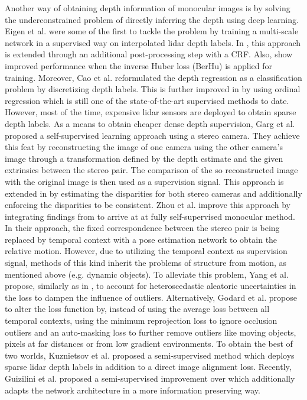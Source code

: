 Another way of obtaining depth information of monocular images is by solving the underconstrained problem of directly inferring the depth using deep learning. Eigen et al. \cite{eigen2014depth} were some of the first to tackle the problem by training a multi-scale network in a supervised way on interpolated lidar depth labels. In \cite{liu2015deep,li2015depth}, this approach is extended through an additional post-processing step with a CRF. Also, \cite{laina2016deeper} show improved performance when the inverse Huber loss (BerHu) is applied for training. Moreover, Cao et al. \cite{cao2017estimating} reformulated the depth regression as a classification problem by discretizing depth labels. This is further improved in \cite{fu2018deep} by using ordinal regression which is still one of the state-of-the-art supervised methods to date. However, most of the time, expensive lidar sensors are deployed to obtain sparse depth labels. As a means to obtain cheaper dense depth supervision, Garg et al. \cite{garg2016unsupervised} proposed a self-supervised learning approach using a stereo camera. They achieve this feat by reconstructing the image of one camera using the other camera's image through a transformation defined by the depth estimate and the given extrinsics between the stereo pair. The comparison of the so reconstructed image with the original image is then used as a supervision signal. This approach is extended in \cite{godard2017unsupervised} by estimating the disparities for both stereo cameras and additionally enforcing the disparities to be consistent. Zhou et al. \cite{zhou2017unsupervised} improve this approach by integrating findings from \cite{ummenhofer2017demon} to arrive at at fully self-supervised monocular method. In their approach, the fixed correspondence between the stereo pair is being replaced by temporal context with a pose estimation network to obtain the relative motion. However, due to utilizing the temporal context as supervision signal, methods of this kind inherit the problems of structure from motion, as mentioned above (e.g. dynamic objects). To alleviate this problem, Yang et al. \cite{yang2020d3vo} propose, similarly as in \cite{feng2019leveraging}, to account for heteroscedastic aleatoric uncertainties in the loss to dampen the influence of outliers. Alternatively, Godard et al. \cite{godard2019digging} propose to alter the loss function by, instead of using the average loss between all temporal contexts, using the minimum reprojection loss to ignore occlusion outliers and an auto-masking loss to further remove outliers like moving objects, pixels at far distances or from low gradient environments. To obtain the best of two worlds, Kuznietsov et al. \cite{kuznietsov2017semi} proposed a semi-supervised method which deploys sparse lidar depth labels in addition to a direct image alignment loss. Recently, Guizilini et al. \cite{guizilini2020robust} proposed a semi-supervised improvement over \cite{godard2019digging} which additionally adapts the network architecture in a more information preserving way.
%
